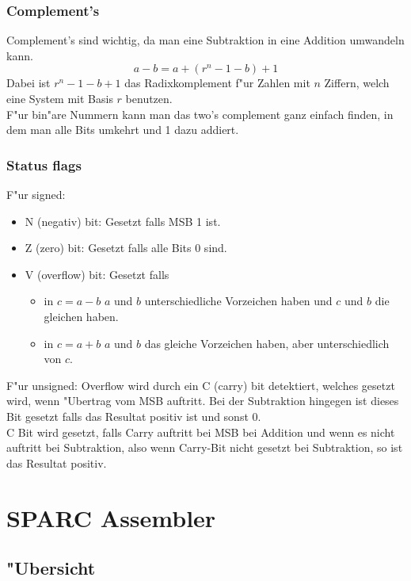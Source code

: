 \documentclass[german, 10pt, a4paper, twocolumn]{scrartcl}
\begin{document}
\subsubsection{Complement's}

Complement's sind wichtig, da man eine Subtraktion in eine Addition umwandeln kann.
\begin{displaymath}
	a-b = a + (r^n -1 -b)+1
\end{displaymath}
Dabei ist $r^n-1-b+1$ das Radixkomplement f"ur Zahlen mit $n$ Ziffern, welch eine System mit Basis $r$ benutzen.\\

F"ur bin"are Nummern kann man das two's complement ganz einfach finden, in dem man alle Bits umkehrt und 1 dazu addiert.

\subsubsection{Status flags}

F"ur signed:
\begin{itemize}
	\item N (negativ) bit: Gesetzt falls MSB 1 ist.
	\item Z (zero) bit: Gesetzt falls alle Bits 0 sind.
	\item V (overflow) bit: Gesetzt falls 
		\begin{itemize}
			\item in $c=a-b$ $a$ und $b$ unterschiedliche Vorzeichen haben und $c$ und $b$ die gleichen haben.
			\item in $c=a+b$ $a$ und $b$ das gleiche Vorzeichen haben, aber unterschiedlich von $c$.
		\end{itemize}
\end{itemize}

F"ur unsigned: Overflow wird durch ein C (carry) bit detektiert, welches gesetzt wird, wenn "Ubertrag vom MSB auftritt. Bei der Subtraktion hingegen ist dieses Bit gesetzt falls das Resultat positiv ist und sonst $0$.\\
C Bit wird gesetzt, falls Carry auftritt bei MSB bei Addition und wenn es nicht auftritt bei Subtraktion, also wenn Carry-Bit nicht gesetzt bei Subtraktion, so ist das Resultat positiv.

\section{SPARC Assembler}

\subsection{"Ubersicht}
\end{document}
